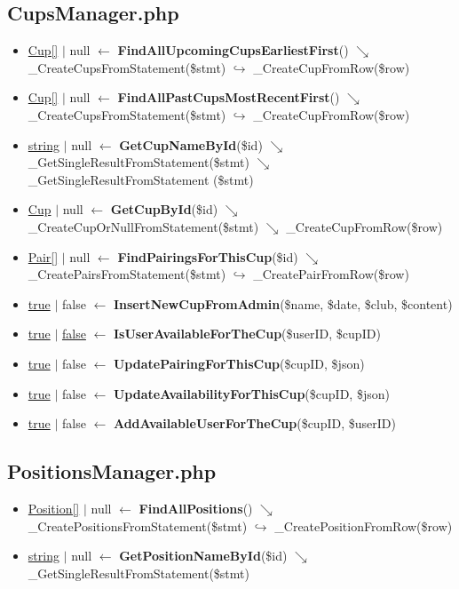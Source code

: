 \subsection{CupsManager.php}
\begin{itemize}
  \setlength\itemsep{0em}
  \item \underline{Cup[]} $\vert$ null $\leftarrow$ \textbf{FindAllUpcomingCupsEarliestFirst}() $\searrow$ \_CreateCupsFromStatement(\$stmt) $\hookrightarrow$ \_CreateCupFromRow(\$row)
  \item \underline{Cup[]} $\vert$ null $\leftarrow$ \textbf{FindAllPastCupsMostRecentFirst}() $\searrow$ \_CreateCupsFromStatement(\$stmt) $\hookrightarrow$ \_CreateCupFromRow(\$row)
  \item \underline{string} $\vert$ null  $\leftarrow$ \textbf{GetCupNameById}(\$id) $\searrow$ \_GetSingleResultFromStatement(\$stmt) $\searrow$ \_GetSingleResultFromStatement (\$stmt)
  \item \underline{Cup} $\vert$ null  $\leftarrow$  \textbf{GetCupById}(\$id) $\searrow$ \_CreateCupOrNullFromStatement(\$stmt)  $\searrow$ \_CreateCupFromRow(\$row)
  \item \underline{Pair[]} $\vert$ null $\leftarrow$  \textbf{FindPairingsForThisCup}(\$id) $\searrow$ \_CreatePairsFromStatement(\$stmt) $\hookrightarrow$ \_CreatePairFromRow(\$row)
  \item \underline{true} $\vert$ false $\leftarrow$  \textbf{InsertNewCupFromAdmin}(\$name, \$date, \$club, \$content)
  \item \underline{true} $\vert$ \underline{false} $\leftarrow$  \textbf{IsUserAvailableForTheCup}(\$userID, \$cupID)
  \item \underline{true} $\vert$ false $\leftarrow$  \textbf{UpdatePairingForThisCup}(\$cupID, \$json)
  \item \underline{true} $\vert$ false $\leftarrow$  \textbf{UpdateAvailabilityForThisCup}(\$cupID, \$json)
  \item \underline{true} $\vert$ false $\leftarrow$  \textbf{AddAvailableUserForTheCup}(\$cupID, \$userID)
\end{itemize}
\subsection{PositionsManager.php}
\begin{itemize}
  \setlength\itemsep{0em}
  \item \underline{Position[]} $\vert$ null $\leftarrow$  \textbf{FindAllPositions}() $\searrow$ \_CreatePositionsFromStatement(\$stmt) $\hookrightarrow$ \_CreatePositionFromRow(\$row)
  \item \underline{string} $\vert$ null $\leftarrow$ \textbf{GetPositionNameById}(\$id) $\searrow$ \_GetSingleResultFromStatement(\$stmt)
\end{itemize}
\newpage
